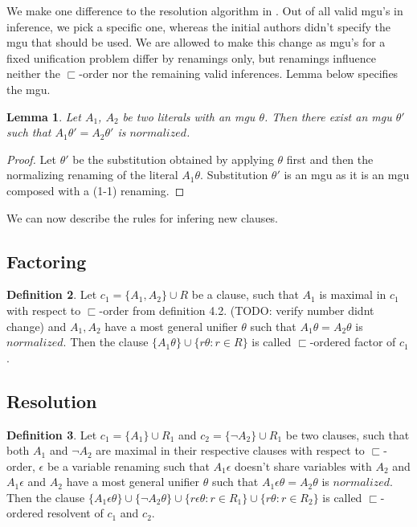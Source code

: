 \documentclass[english, shortabstract]{iithesis}
\theoremstyle{definition} \newtheorem{definition}{Definition}[chapter]
\theoremstyle{remark} \newtheorem{remark}[definition]{Observation}
\theoremstyle{plain} \newtheorem{theorem}[definition]{Theorem}
\theoremstyle{plain} \newtheorem{lemma}[definition]{Lemma}
\begin{document}
We make one difference to the resolution algorithm in \cite{Resolution gf}.
Out of all valid mgu's in inference, we pick a specific one, whereas the initial authors didn't specify the mgu that should be used.
We are allowed to make this change as mgu's for a fixed unification problem differ by renamings only,
but renamings influence neither the $\sqsubset$-order nor the remaining valid inferences.
Lemma below specifies the mgu.
\begin{lemma}
Let $A_1$, $A_2$ be two literals with an mgu $\theta$.
Then there exist an mgu $\theta'$ such that $A_1\theta'=A_2\theta'$ is $normalized$.
\end{lemma}
\begin{proof}
Let $\theta'$ be the substitution obtained by applying $\theta$ first and then the normalizing renaming of the literal $A_1\theta$.
Substitution $\theta'$ is an mgu as it is an mgu composed with a (1-1) renaming.
\end{proof}

We can now describe the rules for infering new clauses.

\subsection{Factoring}

\begin{definition}
Let $c_1=\{A_1, A_2\} \cup R$ be a clause,
such that $A_1$ is maximal in $c_1$ with respect to $\sqsubset$-order from definition 4.2. (TODO: verify number didnt change)
and $A_1, A_2$ have a most general unifier $\theta$ such that $A_1\theta=A_2\theta$ is $normalized$.
Then the clause $\{A_1\theta\}\cup \{r\theta : r \in R\}$ is called $\sqsubset$-ordered factor of $c_1$.
\end{definition}

\subsection{Resolution}

\begin{definition}
Let $c_1=\{A_1\} \cup R_1$ and $c_2=\{\lnot A_2\} \cup R_1$ be two clauses,
such that both $A_1$ and $\lnot A_2$ are maximal in their respective clauses with respect to $\sqsubset$-order,
$\epsilon$ be a variable renaming such that $A_1\epsilon$ doesn't share variables with $A_2$
and $A_1\epsilon$ and $A_2$ have a most general unifier $\theta$ such that $A_1\epsilon\theta=A_2\theta$ is $normalized$.
Then the clause $\{A_1\epsilon\theta\}\cup \{\lnot A_2\theta\} \cup \{r\epsilon\theta : r \in R_1\} \cup \{r\theta : r \in R_2\}$ is called $\sqsubset$-ordered resolvent of $c_1$ and $c_2$.
\end{definition}
\end{document}
